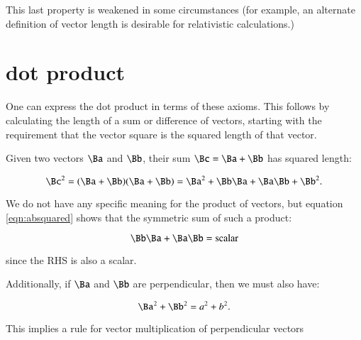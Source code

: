 \documentclass{article}      %
\begin{document}
This last property is weakened in some circumstances (for example, 
an alternate definition of vector length is desirable for relativistic calculations.)

%
%
%

\section{ dot product }

One can express the dot product in terms of these axioms.  This follows by calculating the 
length of a sum or difference of vectors, starting with the requirement that the vector square is the squared length of that vector.

Given two vectors $\Ba$ and $\Bb$, their sum
$\Bc = \Ba + \Bb$ has squared length:

\begin{equation}\label{eqn:absquared}
\Bc^2 = (\Ba + \Bb)(\Ba + \Bb) = \Ba^2 + \Bb\Ba + \Ba\Bb + \Bb^2.
\end{equation}

We do not have any specific meaning for the product of vectors, but equation \ref{eqn:absquared}
shows that the symmetric sum of such a product:

\begin{equation}
\Bb\Ba + \Ba\Bb = \text{scalar}
\end{equation}

since the RHS is also a scalar.

Additionally, if $\Ba$ and $\Bb$ are perpendicular, then we must also have:

\[
\Ba^2 + \Bb^2 = a^2 + b^2.
\]

This implies a rule for vector multiplication of perpendicular vectors
\end{document}
